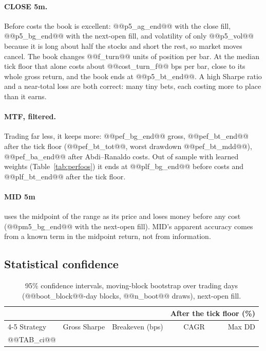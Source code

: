 \documentclass[11pt,a4paper]{article}
\begin{document}
\paragraph{CLOSE 5m.} Before costs the book is excellent: @@p5_ag_end@@ with the close fill, @@p5_bg_end@@
with the next-open fill, and volatility of only @@p5_vol@@ because it is long about half the stocks and short
the rest, so market moves cancel. The book changes @@f_turn@@ units of position per bar. At the median tick floor
that alone costs about @@cost_turn_f@@ bps per bar, close to its whole gross return, and the book ends at
@@p5_bt_end@@. A high Sharpe ratio and a near-total loss are both correct: many tiny bets, each costing
more to place than it earns.

\paragraph{MTF, filtered.} Trading far less, it keeps more: @@pef_bg_end@@ gross, @@pef_bt_end@@ after the tick
floor (@@pef_bt_tot@@, worst drawdown @@pef_bt_mdd@@), @@pef_ba_end@@ after Abdi--Ranaldo costs. Out of sample
with learned weights (Table~\ref{tab:perfoos}) it ends at @@plf_bg_end@@ before costs and @@plf_bt_end@@
after the tick floor.

\paragraph{MID 5m} uses the midpoint of the range as its price and loses money before any cost
(@@pm5_bg_end@@ with the next-open fill). MID's apparent accuracy comes from a known term in the midpoint
return, not from information.

\subsection{Statistical confidence}

\begin{table}[htbp]
\centering
\caption{95\% confidence intervals, moving-block bootstrap over trading days \citep{kunsch1989}
(@@boot_block@@-day blocks, @@n_boot@@ draws), next-open fill.}
\label{tab:ci}
\footnotesize
\setlength{\tabcolsep}{3pt}
\begin{tabular}{@{}lrrrr@{}}
\toprule
& & & \multicolumn{2}{c}{After the tick floor (\%)} \\
\cmidrule(lr){4-5}
Strategy & Gross Sharpe & Breakeven (bps) & CAGR & Max DD \\
\midrule
@@TAB_ci@@
\bottomrule
\end{tabular}
\end{table}
\end{document}

